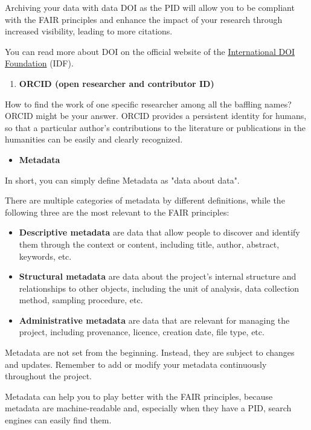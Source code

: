 \documentclass[
]{book}
\providecommand{\tightlist}{%
  \setlength{\itemsep}{0pt}\setlength{\parskip}{0pt}}
\begin{document}
Archiving your data with data DOI as the PID will allow you to be compliant with the FAIR principles and enhance the impact of your research through increased visibility, leading to more citations.

You can read more about DOI on the official website of the \href{https://www.doi.org/}{International DOI Foundation} (IDF).

\begin{enumerate}
\def\labelenumi{\arabic{enumi}.}
\tightlist
\item
  \textbf{ORCID (open researcher and contributor ID)}
\end{enumerate}

How to find the work of one specific researcher among all the baffling names? ORCID might be your answer. ORCID provides a persistent identity for humans, so that a particular author's contributions to the literature or publications in the humanities can be easily and clearly recognized.

\begin{itemize}
\tightlist
\item
  \textbf{Metadata}
\end{itemize}

In short, you can simply define Metadata as "data about data".

There are multiple categories of metadata by different definitions, while the following three are the most relevant to the FAIR principles:

\begin{itemize}
\item
  \textbf{Descriptive metadata} are data that allow people to discover and identify them through the context or content, including title, author, abstract, keywords, etc.
\item
  \textbf{Structural metadata} are data about the project's internal structure and relationships to other objects, including the unit of analysis, data collection method, sampling procedure, etc.
\item
  \textbf{Administrative metadata} are data that are relevant for managing the project, including provenance, licence, creation date, file type, etc.
\end{itemize}

Metadata are not set from the beginning. Instead, they are subject to changes and updates. Remember to add or modify your metadata continuously throughout the project.

Metadata can help you to play better with the FAIR principles, because metadata are machine-readable and, especially when they have a PID, search engines can easily find them.
\end{document}
